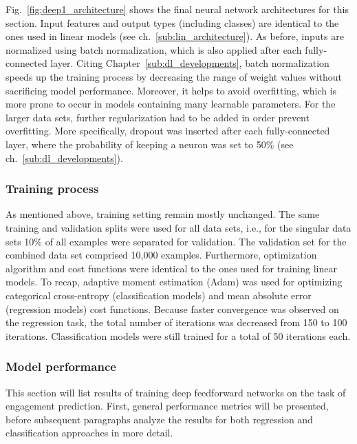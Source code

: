 Fig.~\ref{fig:deep1_architecture} shows the final neural network architectures
for this section.
Input features and output types (including classes) are identical to the ones
used in linear models (see ch.~\ref{sub:lin_architecture}).
As before, inputs are normalized using batch normalization, which is also applied
after each fully-connected layer.
Citing Chapter~\ref{sub:dl_developments}, batch normalization speeds up the
training process by decreasing the range of weight values without sacrificing
model performance.
Moreover, it helps to avoid overfitting, which is more prone to occur in models
containing many learnable parameters.
For the larger data sets, further regularization had to be added in order prevent overfitting.
More specifically, dropout was inserted after each fully-connected layer, where
the probability of keeping a neuron was set to 50\% (see ch.~\ref{sub:dl_developments}).

\subsubsection{Training process}
\label{sub:deep1_training}

As mentioned above, training setting remain mostly unchanged.
The same training and validation splits were used for all data sets, i.e.,
for the singular data sets 10\% of all examples were separated for validation.
The validation set for the combined data set comprised 10,000 examples.
Furthermore, optimization algorithm and cost functions were identical to the ones
used for training linear models.
To recap, adaptive moment estimation (Adam) was used for optimizing
categorical cross-entropy (classification models) and mean absolute error (regression
models) cost functions.
Because faster convergence was observed on the regression task, the total number
of iterations was decreased from 150 to 100 iterations.
Classification models were still trained for a total of 50 iterations each.

\subsubsection{Model performance}
\label{sub:deep1_performance}

This section will list results of training deep feedforward networks on the task
of engagement prediction.
First, general performance metrics will be presented, before subsequent paragraphs
analyze the results for both regression and classification approaches in more
detail.

